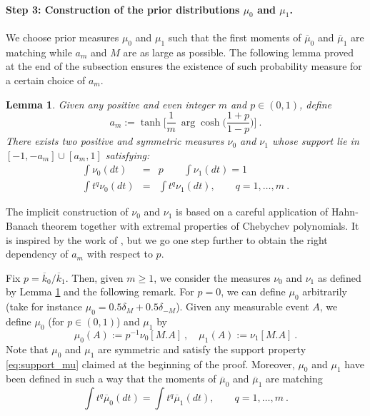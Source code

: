 \documentclass[twoside,11pt]{article}
\newtheorem{lem}{Lemma}
\def\beq{\begin{equation}}
\def\eeq{\end{equation}}
\newcommand{\<}{\langle}
\renewcommand{\>}{\rangle}
\begin{document}
 
 



\paragraph{Step 3: Construction of the prior distributions $\mu_0$ and $\mu_1$.}
We choose prior measures $\mu_0$ and $\mu_1$ such that the first moments of $\overline{\mu}_0$ and $\overline{\mu}_1$ are matching while $a_{m}$ and $M$ are as large as possible. The following lemma proved at the end of the subsection  ensures the existence of such probability measure for a certain choice of $a_m$. 

\begin{lem}\label{lem:nemirovski2}
Given any positive and even integer $m$ and $p\in (0,1)$, define 
\beq\label{eq:defintion_am}
a_{m}:= \tanh\Big[\frac{1}{m}\ \arg\cosh\big(\frac{1+p}{1-p}\big)\Big]\ .
\eeq
 There exists two positive and symmetric measures $\nu_0$ and $\nu_1$ whose support lie in $[-1,-a_{m}]\cup [a_{m},1]$ satisfying:
\begin{eqnarray}
 \int \nu_0(dt)&=&p\quad \quad \int \nu_1(dt)=1 \label{eq:condition_moment0} \\
 \int t^q \nu_0(dt)&= &\int t^q \nu_1(dt) ,\quad \quad q=1,\ldots, m\ .\label{eq:condition_momentq}
\end{eqnarray}
\end{lem}
The implicit construction of $\nu_0$ and $\nu_1$ is based on a careful application of Hahn-Banach theorem together with extremal properties of Chebychev polynomials. It is inspired by the work of \cite{Juditsky_convexity}, but we go one step further to obtain the right dependency of $a_{m}$ with respect to $p$. 


Fix $p=\overline{k}_0/\overline{k}_1$. Then, given $m\geq 1$, we consider the measures $\nu_0$ and $\nu_1$ as defined by Lemma \ref{lem:nemirovski2} and the following remark. For $p=0$, we can define $\mu_0$ arbitrarily (take for instance $\mu_0= 0.5\delta_{M}+ 0.5\delta_{-M}$). Given any measurable event $A$, we define $\mu_0$ (for $p\in (0,1)$) and $\mu_1$ by 
\beq
\mu_0(A):= p^{-1}\nu_0[M  . A] \ , \quad    \mu_1(A):= \nu_1[M .A] \ .
\eeq
Note that $\mu_0$ and $\mu_1$ are symmetric and satisfy the support property \eqref{eq:support_mu} claimed at the beginning of the proof.
Moreover, $\mu_0$ and $\mu_1$ have been defined in such a way that the moments of $\overline{\mu}_0$ and $\overline{\mu}_1$ are matching
\begin{equation}\label{eq:mom}
\int t^q \overline{\mu}_0(dt)= \int t^q \overline{\mu}_1(dt) ,\quad \quad q=1,\ldots, m\ .
\end{equation}
\end{document}
